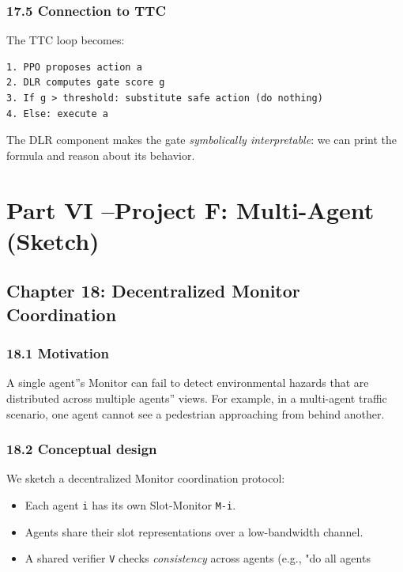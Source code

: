 \documentclass[11pt]{article}
\begin{document}
\subsubsection{17.5 Connection to TTC}

The TTC loop becomes:

\begin{verbatim}
1. PPO proposes action a
2. DLR computes gate score g
3. If g > threshold: substitute safe action (do nothing)
4. Else: execute a
\end{verbatim}

The DLR component makes the gate \textit{symbolically interpretable}: we can print the
formula and reason about its behavior.

\hrulefill

\section{Part VI --Project F: Multi-Agent (Sketch)}

\subsection{Chapter 18: Decentralized Monitor Coordination}

\subsubsection{18.1 Motivation}

A single agent''s Monitor can fail to detect environmental hazards that are
distributed across multiple agents'' views. For example, in a multi-agent
traffic scenario, one agent cannot see a pedestrian approaching from behind
another.

\subsubsection{18.2 Conceptual design}

We sketch a decentralized Monitor coordination protocol:

\begin{itemize}
  \item Each agent \texttt{i} has its own Slot-Monitor \texttt{M-i}.
  \item Agents share their slot representations over a low-bandwidth channel.
  \item A shared verifier \texttt{V} checks \textit{consistency} across agents (e.g., "do all agents
\end{itemize}
\end{document}
